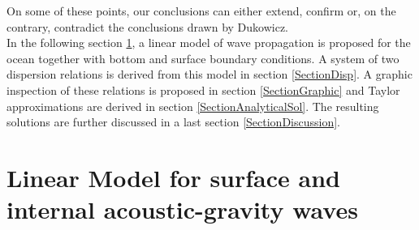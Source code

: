 \documentclass[a4paper,11pt]{article}
\begin{document}
On some of these points, our conclusions can either extend, confirm or, on the contrary, contradict the conclusions drawn by Dukowicz.\\
In the following section \ref{SectionLinModels}, a linear model of wave propagation is proposed for the ocean together with bottom and surface boundary conditions. A system of two dispersion relations is derived from this model in section \ref{SectionDisp}. A graphic inspection of these relations is proposed in section \ref{SectionGraphic} and Taylor approximations are derived in section \ref{SectionAnalyticalSol}. The resulting solutions are further discussed in a last section \ref{SectionDiscussion}.



\newpage
\section{Linear Model for surface and internal acoustic-gravity waves}
\label{SectionLinModels}
\end{document}

